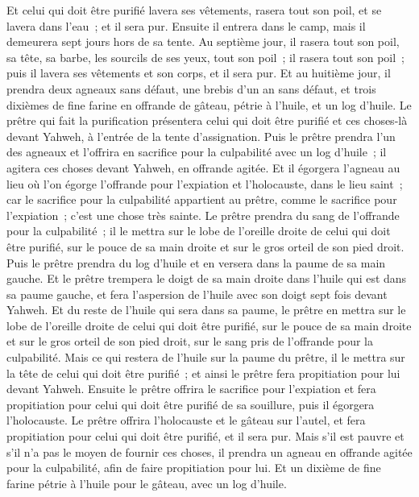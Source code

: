 \begin{multicols}{2}
Et celui qui doit être purifié lavera ses vêtements, rasera tout son poil, et se lavera dans l'eau~; et il sera pur. Ensuite il entrera dans le camp, mais il demeurera sept jours hors de sa tente.
Au septième jour, il rasera tout son poil, sa tête, sa barbe, les sourcils de ses yeux, tout son poil~; il rasera tout son poil~; puis il lavera ses vêtements et son corps, et il sera pur.
Et au huitième jour, il prendra deux agneaux sans défaut, une brebis d'un an sans défaut, et trois dixièmes de fine farine en offrande de gâteau, pétrie à l'huile, et un log d'huile.
Le prêtre qui fait la purification présentera celui qui doit être purifié et ces choses-là devant Yahweh, à l'entrée de la tente d'assignation.
Puis le prêtre prendra l'un des agneaux et l'offrira en sacrifice pour la culpabilité avec un log d'huile~; il agitera ces choses devant Yahweh, en offrande agitée.
Et il égorgera l'agneau au lieu où l'on égorge l'offrande pour l'expiation et l'holocauste, dans le lieu saint~; car le sacrifice pour la culpabilité appartient au prêtre, comme le sacrifice pour l'expiation~; c'est une chose très sainte.
Le prêtre prendra du sang de l'offrande pour la culpabilité~; il le mettra sur le lobe de l'oreille droite de celui qui doit être purifié, sur le pouce de sa main droite et sur le gros orteil de son pied droit.
Puis le prêtre prendra du log d'huile et en versera dans la paume de sa main gauche.
Et le prêtre trempera le doigt de sa main droite dans l'huile qui est dans sa paume gauche, et fera l'aspersion de l'huile avec son doigt sept fois devant Yahweh.
Et du reste de l'huile qui sera dans sa paume, le prêtre en mettra sur le lobe de l'oreille droite de celui qui doit être purifié, sur le pouce de sa main droite et sur le gros orteil de son pied droit, sur le sang pris de l'offrande pour la culpabilité.
Mais ce qui restera de l'huile sur la paume du prêtre, il le mettra sur la tête de celui qui doit être purifié~; et ainsi le prêtre fera propitiation pour lui devant Yahweh.
Ensuite le prêtre offrira le sacrifice pour l'expiation et fera propitiation pour celui qui doit être purifié de sa souillure, puis il égorgera l'holocauste.
Le prêtre offrira l'holocauste et le gâteau sur l'autel, et fera propitiation pour celui qui doit être purifié, et il sera pur.
Mais s'il est pauvre et s'il n'a pas le moyen de fournir ces choses, il prendra un agneau en offrande agitée pour la culpabilité, afin de faire propitiation pour lui. Et un dixième de fine farine pétrie à l'huile pour le gâteau, avec un log d'huile.

\end{multicols}
